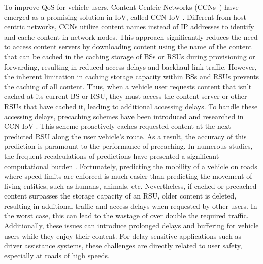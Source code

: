 \documentclass[journal]{IEEEtran}
\begin{document}
To improve QoS for vehicle users, Content-Centric Networks (CCNs~\cite{Jacobson2009, zhang2014}) have emerged as a promising solution in IoV, called CCN-IoV \cite{Li2017, Hichri2021}.
Different from host-centric networks, CCNs utilize content names instead of IP addresses to identify and cache content in network nodes.
This approach significantly reduces the need to access content servers by downloading content using the name of the content that can be cached in the caching storage of BSs or RSUs during provisioning or forwarding, resulting in reduced access delays and backhaul link traffic.
However, the inherent limitation in caching storage capacity within BSs and RSUs prevents the caching of all content.
Thus, when a vehicle user requests content that isn't cached at its current BS or RSU, they must access the content server or other RSUs that have cached it, leading to additional accessing delays.
To handle these accessing delays, precaching schemes have been introduced and researched in CCN-IoV \cite{Ding2022, Wu2022, AlNagar2022}.
This scheme proactively caches requested content at the next predicted RSU along the user vehicle's route.
As a result, the accuracy of this prediction is paramount to the performance of precaching.
In numerous studies, the frequent recalculations of predictions have presented a significant computational burden \cite{Yu2022, Xu2020}.
Fortunately, predicting the mobility of a vehicle on roads where speed limits are enforced is much easier than predicting the movement of living entities, such as humans, animals, etc.
Nevertheless, if cached or precached content surpasses the storage capacity of an RSU, older content is deleted, resulting in additional traffic and access delays when requested by other users.
In the worst case, this can lead to the wastage of over double the required traffic.
Additionally, these issues can introduce prolonged delays and buffering for vehicle users while they enjoy their content.
For delay-sensitive applications such as driver assistance systems, these challenges are directly related to user safety, especially at roads of high speeds.
\end{document}
